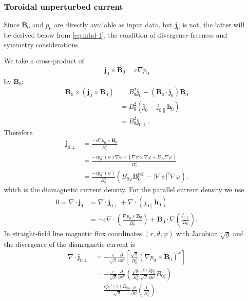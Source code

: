 \documentclass[a4paper, 10pt, english]{article}
\let\temp\vartheta
\let\vartheta\theta
\let\theta\temp
\let\temp\varphi
\let\varphi\phi
\let\phi\temp
\let\vec\symbf
\newcommand*\pd[2][]{\ensuremath{\frac{\partial #1}{\partial #2}}}  %
\newcommand*\pol{\ensuremath{\textrm{pol}}}  %
\begin{document}
\subsubsection{Toroidal unperturbed current}

Since $\vec{B}_{0}$ and $p_{0}$ are directly available as input data, but $\vec{j}_{0}$ is not, the latter will be derived below from \cref{eq:mhd-1}, the condition of divergence-freeness and symmetry considerations.

We take a cross-product of
\begin{gather}
  \vec{j}_{0} \times \vec{B}_{0} = c \nabla p_{0}
\end{gather}
by $\vec{B}_{0}$:
\begin{align}
  \vec{B}_{0} \times \left( \vec{j}_{0} \times \vec{B}_{0} \right) &= B_{0}^{2} \vec{j}_{0} - (\vec{B}_{0} \cdot \vec{j}_{0}) \vec{B}_{0} \nonumber \\
  &= B_{0}^{2} (\vec{j}_{0} - j_{0 \parallel} \vec{h}_{0}) \nonumber \\
  &= B_{0}^{2} \vec{j}_{0 \perp}.
\end{align}
Therefore
\begin{align}
  \vec{j}_{0 \perp} &= \frac{-c \nabla p_{0} \times \vec{B}_{0}}{B_{0}^{2}} \\
  &= \frac{-c p_{0}' (\psi) \nabla \psi \times (\nabla \psi \times \nabla \phi + B_{0 \phi} \nabla \phi)}{B_{0}^{2}} \nonumber \\
  &= \frac{-c p_{0}' (\psi)}{B_{0}^{2}} \left( B_{0 \phi} \vec{B}_{0}^{\pol} - \lvert \nabla \psi \rvert^{2} \nabla \phi \right).
\end{align}
which is the diamagnetic current density. For the parallel current density we use
\begin{align}
 0 = \nabla \cdot \vec{j}_{0} &= \nabla \cdot \vec{j}_{0 \perp} + \nabla \cdot (j_{0 \parallel} \vec{h}_{0}) \nonumber \\
 &= -c \nabla \cdot \left( \frac{\nabla p_{0} \times \vec{B}_{0}}{B_{0}^{2}} \right) + \vec{B}_{0} \cdot \nabla \left( \frac{j_{0 \parallel}}{B_{0}} \right).
\end{align}
In straight-field line magnetic flux coordinates $(r, \theta, \phi)$ with Jacobian $\sqrt{g}$ and the divergence of the diamagnetic current is
\begin{align}
  \nabla \cdot \vec{j}_{0 \perp} &= -\frac{c}{\sqrt{g}} \pd{x^{k}} \left[ \frac{\sqrt{g}}{B_{0}^{2}} \left( \nabla p_{0} \times \vec{B}_{0} \right)^{k} \right] \nonumber \\
  &= -\frac{c}{\sqrt{g}} \pd{x^{k}} \left( \frac{\sqrt{g}}{B_{0}^{2}} \frac{\varepsilon^{ijk}}{\sqrt{g}} \pd[p_{0}]{x^{i}} B_{0 j} \right) \nonumber \\
  &= \frac{c p_{0}' (r) B_{0 \phi}}{\sqrt{g}} \pd{\theta} \left( \frac{1}{B_{0}^{2}} \right),
\end{align}
\end{document}
